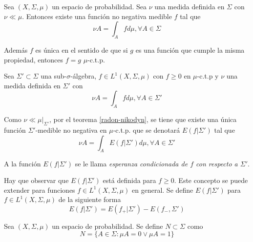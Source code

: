 \begin{teorema}\label{radon-nikodyn}
	Sea $(X,\Sigma,\mu)$ un espacio de probabilidad. Sea $\nu$ una medida definida en $\Sigma$ con $\nu \ll \mu$. Entonces existe una función no negativa medible $f$ tal que	
	\begin{equation}
		\nu A = \int_A f d\mu, \forall A \in \Sigma
	\end{equation}
	
	Además $f$ es única en el sentido de que si $g$ es una función que cumple la misma propiedad, entonces $f = g$ $\mu$-c.t.p.
\end{teorema}

\begin{definicion}\label{esperanza_conficionada_def}
	Sea $\Sigma' \subset \Sigma$ una sub-$\sigma$-álgebra, $f \in L^1(X,\Sigma,\mu)$ con $f \geq 0$ en $\mu$-c.t.p y $\nu$ una medida definida en $\Sigma'$ con	
	\begin{equation}
		\nu A = \int_A f d\mu, \forall A \in \Sigma'
	\end{equation}
	
	Como $\nu \ll \mu|_{\Sigma'}$, por el teorema \ref*{radon-nikodyn}, se tiene que existe una única función $\Sigma'$-medible no negativa en $\mu$-c.t.p. que se denotará $E(f|\Sigma')$ tal que	
	\begin{equation}
		\nu A = \int_A E(f|\Sigma') d\mu, \forall A \in \Sigma'
	\end{equation}
	
	A la función $E(f|\Sigma')$ se le llama \textit{esperanza condicionada de $f$ con respecto a $\Sigma'$}. 
\end{definicion}

Hay que observar que $E(f|\Sigma')$ está definida para $f \geq 0$. Este concepto se puede extender para funciones $f \in L^1(X,\Sigma,\mu)$ en general. Se define $E(f|\Sigma')$ para $f \in L^1(X,\Sigma,\mu)$ de la siguiente forma
\begin{equation}
	E(f|\Sigma') = E(f_+|\Sigma')- E(f_-,\Sigma')
\end{equation}

\begin{definicion}\label{trivial_sigma-algebra}
	Sea $(X,\Sigma,\mu)$ un espacio de probabilidad. Se define $N \subset \Sigma$ como	
	\begin{equation}
	N = \{ A \in \Sigma: \mu A = 0 \vee \mu A = 1 \}
	\end{equation}
\end{definicion}

